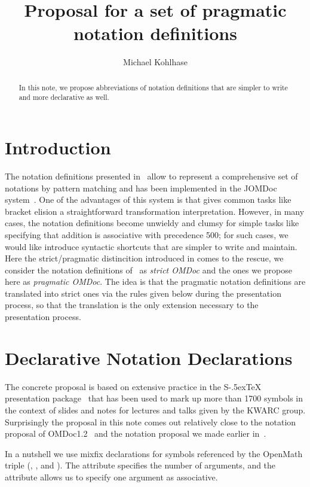 \documentclass{article}
\title{Proposal for a set of pragmatic notation definitions}
\author{Michael Kohlhase}
\def\stex{{\raisebox{-.5ex}S\kern-.5ex\TeX}}
\begin{document}
\maketitle
\begin{abstract}
  In this note, we propose abbreviations of notation definitions that are simpler to write
  and more declarative as well.
\end{abstract}
\tableofcontents\newpage
\section{Introduction}

The notation definitions presented in~\cite{KMR:NoLMD08} allow to represent a
comprehensive set of notations by pattern matching and has been implemented in the JOMDoc
system~\cite{JOMDoc:webpage}. One of the advantages of this system is that gives common
tasks like bracket elision a straightforward transformation interpretation. However, in
many cases, the notation definitions become unwieldy and clumsy for simple tasks like
specifying that addition is associative with precedence 500; for such cases, we would like
introduce syntactic shortcuts that are simpler to write and maintain. Here the
strict/pragmatic distincition introduced in {} comes to the rescue, we
consider the notation definitions of~\cite{KMR:NoLMD08} as {\emph{strict OMDoc}} and the
ones we propose here as {\emph{pragmatic OMDoc}}. The idea is that the pragmatic notation
definitions are translated into strict ones via the rules given below during the
presentation process, so that the translation is the only extension necessary to the
presentation process.

\section{Declarative Notation Declarations}

The concrete proposal is based on extensive practice in the {\stex} presentation
package~\cite{Kohlhase:ipsmsl08} that has been used to mark up more than 1700 symbols in
the context of slides and notes for lectures and talks given by the KWARC group.
Surprisingly the proposal in this note comes out relatively close to the notation proposal
of OMDoc1.2~\cite{Kohlhase:OMDoc1.2} and the notation proposal we made earlier
in~\cite{KohLanRab:pmcfe07}.

In a nutshell we use mixfix declarations for symbols referenced by the OpenMath triple
({}, {}, and
{}). The attribute {} specifies the
number of arguments, and the attribute {} allows us to specify
one argument as associative.
\end{document}
